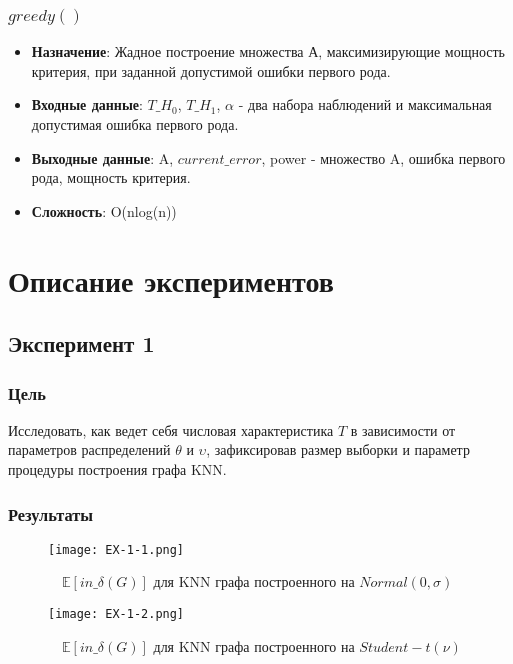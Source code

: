 \documentclass[a4paper, 12pt]{article}
\begin{document}
\subsubsection{$greedy()$}
\begin{itemize}
    \item \textbf{Назначение}: Жадное построение множества А, максимизирующие мощность критерия, при заданной допустимой ошибки первого рода.
    \item \textbf{Входные данные}: $T\_H_0$, $T\_H_1$, $\alpha$ - два набора наблюдений и максимальная допустимая ошибка первого рода.
    \item \textbf{Выходные данные}: A, $current\_error$, power - множество A, ошибка первого рода, мощность критерия. 
    \item \textbf{Сложность}: O(nlog(n))
\end{itemize}
\newpage
\section{Описание экспериментов}
\subsection{Эксперимент 1}
\subsubsection{Цель}
Исследовать, как ведет себя числовая характеристика $T$ в зависимости
от параметров распределений $θ$ и $υ$, зафиксировав размер выборки и
параметр процедуры построения графа KNN.\\

\subsubsection{Результаты}

\begin{figure}[H]
    \centering
    \texttt{[image: EX-1-1.png]}
    \caption{$\quad \mathbb{E}[in\_\delta(G)]$ для KNN графа построенного на $Normal(0,\sigma)$}
    \label{fig:uml}
\end{figure}

\begin{figure}[H]
    \centering
    \texttt{[image: EX-1-2.png]}
    \caption{$\quad \mathbb{E}[in\_\delta(G)]$ для KNN графа построенного на $Student-t(ν)$}
    \label{fig:uml}
\end{figure}
\end{document}

